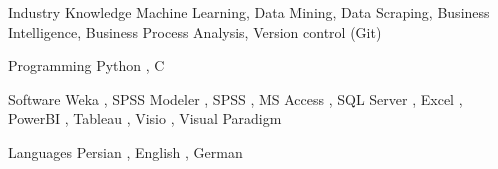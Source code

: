 

\begin{cvskills}

  \cvskill
    {Industry Knowledge} %
    {Machine Learning, Data Mining, Data Scraping, Business Intelligence, Business Process Analysis, Version control (Git)} %

  \cvskill
    {Programming} %
    {Python , C} %

  \cvskill
    {Software} %
    {Weka , SPSS Modeler , SPSS , MS Access , SQL Server , Excel , PowerBI , Tableau , Visio , Visual Paradigm} %

  \cvskill
    {Languages} %
    {Persian , English , German} %


\end{cvskills}
